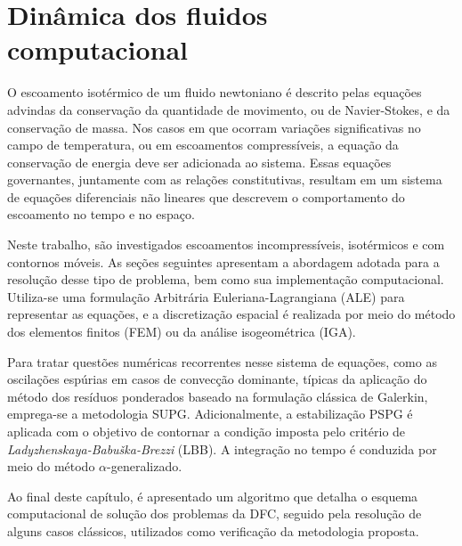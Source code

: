 \documentclass[tese_patricia]{subfiles}%
\begin{document}
\chapter[Dinâmica dos fluidos computacional]{Dinâmica dos fluidos computacional}
\label{capitulo:Cap2}

O escoamento isotérmico de um fluido newtoniano é descrito pelas equações advindas da conservação da quantidade de movimento, ou de Navier-Stokes, e da conservação de massa. Nos casos em que ocorram variações significativas no campo de temperatura, ou em escoamentos compressíveis, a equação da conservação de energia deve ser adicionada ao sistema. Essas equações governantes, juntamente com as relações constitutivas, resultam em um sistema de equações diferenciais não lineares que descrevem o comportamento do escoamento no tempo e no espaço. 

Neste trabalho, são investigados escoamentos incompressíveis, isotérmicos e com contornos móveis. As seções seguintes apresentam a abordagem adotada para a resolução desse tipo de problema, bem como sua implementação computacional. Utiliza-se uma formulação Arbitrária Euleriana-Lagrangiana (ALE) para representar as equações, e a discretização espacial é realizada por meio do método dos elementos finitos (FEM) ou da análise isogeométrica (IGA).

Para tratar questões numéricas recorrentes nesse sistema de equações, como as oscilações espúrias em casos de convecção dominante, típicas da aplicação do método dos resíduos ponderados baseado na formulação clássica de Galerkin, emprega-se a metodologia SUPG. Adicionalmente, a estabilização PSPG é aplicada com o objetivo de contornar a condição imposta pelo critério de \textit{Ladyzhenskaya-Babuška-Brezzi} (LBB). A integração no tempo é conduzida por meio do método $\alpha$-generalizado.

Ao final deste capítulo, é apresentado um algoritmo que detalha o esquema computacional de solução dos problemas da DFC, seguido pela resolução de alguns casos clássicos, utilizados como verificação da metodologia proposta.
\end{document}
